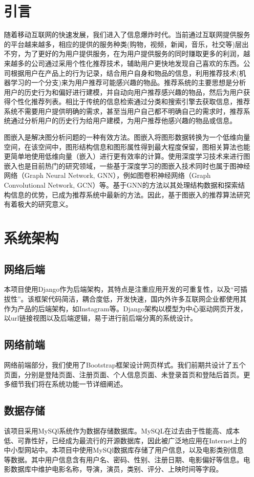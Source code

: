 \documentclass{ctexart}
\begin{document}
\section{引言}
随着移动互联网的快速发展，我们进入了信息爆炸时代。当前通过互联网提供服务的平台越来越多，相应的提供的服务种类(购物，视频，新闻，音乐，社交等)层出不穷，为了更好的为用户提供服务，在为用户提供服务的同时赚取更多的利润，越来越多的公司通过采用个性化推荐技术，辅助用户更快地发现自己喜欢的东西。公司根据用户在产品上的行为记录，结合用户自身和物品的信息，利用推荐技术(机器学习的一个分支)来为用户推荐可能感兴趣的物品。推荐系统的主要思想是分析用户的历史行为和偏好进行建模，并自动向用户推荐感兴趣的物品，然后为用户获得个性化推荐列表。相比于传统的信息检索通过分类和搜索引擎去获取信息，推荐系统不需要用户提供明确的需求，甚至当用户自己都不明确自己的需求时，推荐系统通过分析用户的历史行为给用户建模，为用户推荐他感兴趣的物品或信息。

图嵌入是解决图分析问题的一种有效方法。图嵌入将图形数据转换为一个低维向量空间，在该空间中，图形结构信息和图形属性得到最大程度保留，图相关算法也能更简单地使用低维向量（嵌入）进行更有效率的计算。使用深度学习技术来进行图嵌入也是目前热门的研究领域，一些基于深度学习的图嵌入技术同时也属于图神经网络（Graph Neural Network, GNN），例如图卷积神经网络（Graph Convolutional Network, GCN）等。基于GNN的方法以其处理结构数据和探索结构信息的优势，已成为推荐系统中最新的方法。因此，基于图嵌入的推荐算法研究有着极大的研究意义。

\section{系统架构}
\subsection{网络后端}
本项目使用Django作为后端架构，其特点是注重应用开发的可重复性，以及“可插拔性”。该框架代码简洁，耦合度低，开发快速，国内外许多互联网企业都使用其作为产品的后端架构，如Instagram等。Django架构以模型为中心驱动网页开发，以url链接视图以及后端逻辑，易于进行前后端分离的系统设计。

\subsection{网络前端}
网络前端部分，我们使用了Bootstrap框架设计网页样式。我们前期共设计了五个页面，分别是登陆页面、注册页面、个人信息页面、未登录首页和登陆后首页。更多细节我们将在系统功能一节详细阐述。

\subsection{数据存储}
该项目采用MySQl系统作为数据存储数据库。MySQL在过去由于性能高、成本低、可靠性好，已经成为最流行的开源数据库，因此被广泛地应用在Internet上的中小型网站中。本项目中使用MySQl数据库存储了用户信息，以及电影类别信息等数据。其中用户信息含有用户名、密码、性别、注册日期、电影偏好等信息。电影数据库中维护电影名称，导演，演员，类别、评分、上映时间等字段。
\end{document}
